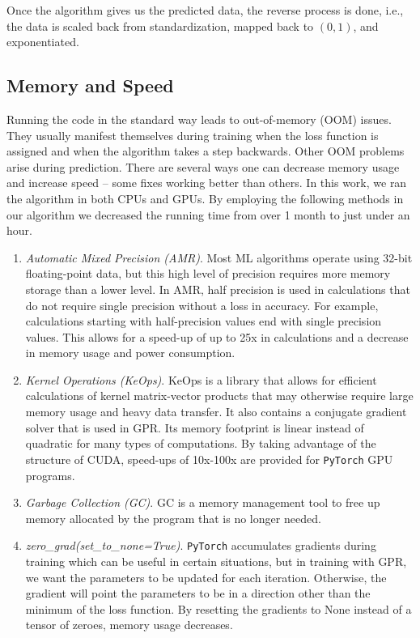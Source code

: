\documentclass[aps,prd,twocolumn,superscriptaddress,preprintnumbers,floatfix,nofootinbib]{revtex4-2}
\begin{document}
Once the algorithm gives us the predicted data, the reverse process is done, i.e., 
the data is scaled back from standardization, mapped back to $(0,1)$, and exponentiated. 

\subsection{Memory and Speed}
Running the code in the standard way leads to out-of-memory (OOM) issues. They
usually manifest themselves during training when the loss function is assigned
and when the algorithm takes a step backwards. Other OOM problems arise during 
prediction. There are several ways one can decrease memory usage and increase
speed -- some fixes working better than others. In this work, we ran the
algorithm in both CPUs and GPUs. By employing the following methods in our
algorithm we decreased the running time from over 1 month to just under an
hour.
\begin{enumerate}[label=(\roman*)]
        \item \textit{Automatic Mixed Precision (AMR)}. Most ML algorithms 
            operate using 32-bit floating-point data, but
            this high level of precision requires more memory storage than a
            lower level. In AMR, half precision is used in calculations that do
            not require single precision without a loss in accuracy. For
            example, calculations starting with half-precision values end with
            single precision values. This allows for a speed-up of up to 25x in
            calculations and a decrease in memory usage and power consumption. 
        \item \textit{Kernel Operations (KeOps)}. KeOps is a library that
            allows for efficient calculations of kernel matrix-vector products
            that may otherwise require large memory usage and heavy data
            transfer. It also contains a conjugate gradient solver that is used
            in GPR. Its memory footprint is linear instead of quadratic for
            many types of computations. By taking advantage of the structure of
            CUDA, speed-ups of 10x-100x are provided for \texttt{PyTorch} GPU 
            programs.
        \item \textit{Garbage Collection (GC)}. GC is a memory management tool 
            to free up memory allocated by the program that is no longer
            needed. 
        \item \textit{zero\_grad(set\_to\_none=True)}. \texttt{PyTorch} accumulates gradients
            during training which can be useful in certain situations, but in
            training with GPR, we want the parameters to be updated for each
            iteration. Otherwise, the gradient will point the parameters to be
            in a direction other than the minimum of the loss function. By
            resetting the gradients to None instead of a tensor of zeroes,
            memory usage decreases.  
\end{enumerate}
\end{document}

